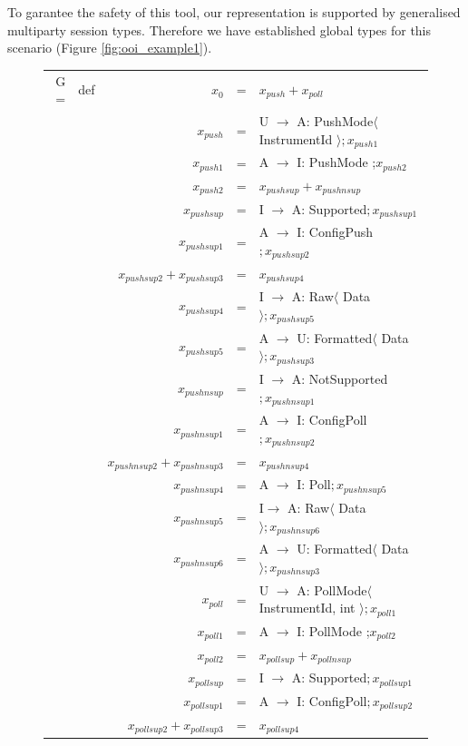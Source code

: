 \documentclass[a4paper,11pt,twoside]{report}
\begin{document}
To garantee the safety of this tool, our representation is supported by generalised multiparty session types. Therefore we have established global types for this scenario (Figure \ref{fig:ooi_example1}). 
\begin{figure}[h]
\begin{tabular}{rcrcl}
G =& def & $x_{0}$ &=& $x_{push} + x_{poll}$\\
&& $x_{push}$ &=& U $\rightarrow$ A: PushMode$\langle$ InstrumentId $\rangle ; x_{push1}$\\
&& $x_{push1}$ &=& A $\rightarrow$ I: PushMode ;$ x_{push2}$\\
&& $x_{push2}$ &=& $ x_{pushsup} + x_{pushnsup}$\\
&& $x_{pushsup}$ &=& I $\rightarrow$ A: Supported$ ; x_{pushsup1}$\\
&& $x_{pushsup1}$ &=& A $\rightarrow$ I: ConfigPush$ ; x_{pushsup2}$\\
&& $x_{pushsup2} + x_{pushsup3}$ &=& $x_{pushsup4}$\\
&& $x_{pushsup4}$ &=& I $\rightarrow$ A: Raw$\langle$ Data $\rangle ; x_{pushsup5}$\\
&& $x_{pushsup5}$ &=& A $\rightarrow$ U: Formatted$\langle$ Data $\rangle ; x_{pushsup3}$\\
&& $x_{pushnsup}$ &=& I $\rightarrow$ A: NotSupported$ ; x_{pushnsup1}$\\
&& $x_{pushnsup1}$ &=& A $\rightarrow$ I: ConfigPoll$ ; x_{pushnsup2}$\\
&& $x_{pushnsup2} + x_{pushnsup3}$ &=& $x_{pushnsup4}$\\
&& $x_{pushnsup4}$ &=& A $\rightarrow$ I: Poll$ ; x_{pushnsup5}$\\
&& $x_{pushnsup5}$ &= & I$\rightarrow$ A: Raw$\langle$ Data $\rangle ; x_{pushnsup6}$\\
&& $x_{pushnsup6}$ &=& A $\rightarrow$ U: Formatted$\langle$ Data $\rangle ; x_{pushnsup3}$\\
&& $x_{poll}$ &=& U $\rightarrow$ A: PollMode$\langle$ InstrumentId, int $\rangle ; x_{poll1}$\\
&& $x_{poll1}$ &=& A $\rightarrow$ I: PollMode ;$ x_{poll2}$\\
&& $x_{poll2}$ &=& $ x_{pollsup} + x_{pollnsup}$\\
&& $x_{pollsup}$ &=& I $\rightarrow$ A: Supported$ ; x_{pollsup1}$\\
&& $x_{pollsup1}$ &=& A $\rightarrow$ I: ConfigPoll$ ; x_{pollsup2}$\\
&& $x_{pollsup2} + x_{pollsup3}$ &=& $x_{pollsup4}$\\

\end{tabular}
\end{figure}
\end{document}
